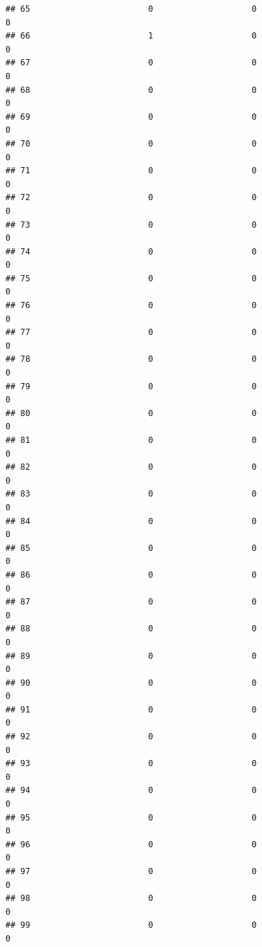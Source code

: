 \documentclass[
]{article}
\begin{document}
\begin{verbatim}
## 65                        0                    0                      0
## 66                        1                    0                      0
## 67                        0                    0                      0
## 68                        0                    0                      0
## 69                        0                    0                      0
## 70                        0                    0                      0
## 71                        0                    0                      0
## 72                        0                    0                      0
## 73                        0                    0                      0
## 74                        0                    0                      0
## 75                        0                    0                      0
## 76                        0                    0                      0
## 77                        0                    0                      0
## 78                        0                    0                      0
## 79                        0                    0                      0
## 80                        0                    0                      0
## 81                        0                    0                      0
## 82                        0                    0                      0
## 83                        0                    0                      0
## 84                        0                    0                      0
## 85                        0                    0                      0
## 86                        0                    0                      0
## 87                        0                    0                      0
## 88                        0                    0                      0
## 89                        0                    0                      0
## 90                        0                    0                      0
## 91                        0                    0                      0
## 92                        0                    0                      0
## 93                        0                    0                      0
## 94                        0                    0                      0
## 95                        0                    0                      0
## 96                        0                    0                      0
## 97                        0                    0                      0
## 98                        0                    0                      0
## 99                        0                    0                      0

\end{verbatim}
\end{document}
